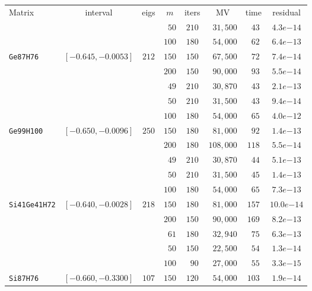 \begin{tabular}{l|c|c|c|c|c|c|c}
\hline
\multirow{2}{*}{Matrix} & \multirow{2}{*}{interval} & \multirow{2}{*}{eigs} & \multirow{2}{*}{$m$} & \multirow{2}{*}{iters} & \multirow{2}{*}{MV} & \multirow{2}{*}{time} & \multirow{2}{*}{residual} \\
 & & & & & & & \\\hline
\hline
 & & & $\phantom{0}50$ & $210$ & $\phantom{0}31,500$ & $\phantom{0}43$ & $4.3e{-14}$ \\
 & & & $100$ & $180$ & $\phantom{0}54,000$ & $\phantom{0}62$ & $6.4e{-13}$ \\
\verb|Ge87H76| & $[-0.645,-0.0053]$ & $212$ & $150$ & $150$ & $\phantom{0}67,500$ & $\phantom{0}72$ & $7.4e{-14}$ \\
 & & & $200$ & $150$ & $\phantom{0}90,000$ & $\phantom{0}93$ & $5.5e{-14}$ \\
 & & & $\phantom{0}49$ & $210$ & $\phantom{0}30,870$ & $\phantom{0}43$ & $2.1e{-13}$ \\\hline
 & & & $\phantom{0}50$ & $210$ & $\phantom{0}31,500$ & $\phantom{0}43$ & $9.4e{-14}$ \\
 & & & $100$ & $180$ & $\phantom{0}54,000$ & $\phantom{0}65$ & $4.0e{-12}$ \\
\verb|Ge99H100| & $[-0.650,-0.0096]$ & $250$ & $150$ & $180$ & $\phantom{0}81,000$ & $\phantom{0}92$ & $1.4e{-13}$ \\
 & & & $200$ & $180$ & $108,000$ & $118$ & $5.5e{-14}$ \\
 & & & $\phantom{0}49$ & $210$ & $\phantom{0}30,870$ & $\phantom{0}44$ & $5.1e{-13}$ \\\hline
 & & & $\phantom{0}50$ & $210$ & $\phantom{0}31,500$ & $\phantom{0}45$ & $1.4e{-13}$ \\
 & & & $100$ & $180$ & $\phantom{0}54,000$ & $\phantom{0}65$ & $7.3e{-13}$ \\
\verb|Si41Ge41H72| & $[-0.640,-0.0028]$ & $218$ & $150$ & $180$ & $\phantom{0}81,000$ & $157$ & $10.0e{-14}$ \\
 & & & $200$ & $150$ & $\phantom{0}90,000$ & $169$ & $8.2e{-13}$ \\
 & & & $\phantom{0}61$ & $180$ & $\phantom{0}32,940$ & $\phantom{0}75$ & $6.3e{-13}$ \\\hline
 & & & $\phantom{0}50$ & $150$ & $\phantom{0}22,500$ & $\phantom{0}54$ & $1.3e{-14}$ \\
 & & & $100$ & $\phantom{0}90$ & $\phantom{0}27,000$ & $\phantom{0}55$ & $3.3e{-15}$ \\
\verb|Si87H76| & $[-0.660,-0.3300]$ & $107$ & $150$ & $120$ & $\phantom{0}54,000$ & $103$ & $1.9e{-14}$ \\

\end{tabular}
